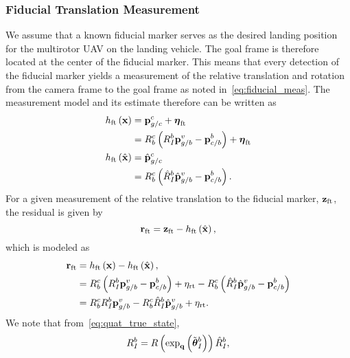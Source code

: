 \subsubsection{Fiducial Translation Measurement}
We assume that a known fiducial marker serves as the desired landing position
for the multirotor UAV on the landing vehicle. The goal frame is therefore
located at the center of the fiducial marker. This means that every detection of the fiducial
marker yields a measurement of the relative translation and rotation from the
camera frame to the goal frame as noted in~\eqref{eq:fiducial_meas}.
The measurement model and its estimate
therefore can be written as
\begin{align*}
  h_{\text{ft}} \left( \boldsymbol{\mathrm{x}} \right) &=
  \boldsymbol{\mathrm{p}}_{g/c}^c + \boldsymbol{\mathrm{\eta}}_{\text{ft}} \\
  &= R_b^c \left( R_I^b \boldsymbol{\mathrm{p}}_{g/b}^v -
  \boldsymbol{\mathrm{p}}_{c/b}^b \right) + \boldsymbol{\mathrm{\eta}}_{\text{ft}} \\
  h_{\text{ft}} \left( \hat{\boldsymbol{\mathrm{x}}} \right) &=
    \hat{\boldsymbol{\mathrm{p}}}_{g/c}^c \\
  &= R_b^c \left( \hat{R}_I^b \hat{\boldsymbol{\mathrm{p}}}_{g/b}^v -
    \boldsymbol{\mathrm{p}}_{c/b}^b \right). 
\end{align*}
For a given measurement of the relative translation to the fiducial marker,
$\boldsymbol{\mathrm{z}}_{\text{ft}}$, the residual is given by
\begin{equation*}
  \boldsymbol{\mathrm{r}}_{\text{ft}} = \boldsymbol{\mathrm{z}}_{\text{ft}} - h_{\text{ft}} \left( \hat{\boldsymbol{\mathrm{x}}}
  \right),
\end{equation*}
which is modeled as
\begin{align}
  \vect{r}_{\text{ft}} &=  h_{\text{ft}} \left( \x \right) - h_{\text{ft}} \left( \hat{\x}
  \right), \\
                       &= R_b^c \left( R_I^b \vect{p}_{g/b}^v -
                         \vect{p}_{c/b}^b \right)  +\eta_{\text{rt}} - R_b^c \left( \hat{R}_I^b \hat{\vect{p}}_{g/b}^v -
    \vect{p}_{c/b}^b \right)  \\
                       &= R_b^c R_I^b \vect{p}_{g/b}^v 
                          - R_b^c \hat{R}_I^b \hat{\vect{p}}_{g/b}^v +
                          \eta_{\text{rt}}.
                          \label{eq:rft_1}
\end{align}
We note that from~\eqref{eq:quat_true_state},
\begin{equation*}
  R_I^b = R \left( \exp_{\boldsymbol{\mathrm{q}}} \left( \tilde{\boldsymbol{\mathrm{\theta}}}_I^b \right) \right)
  \hat{R}_I^b,
\end{equation*}

